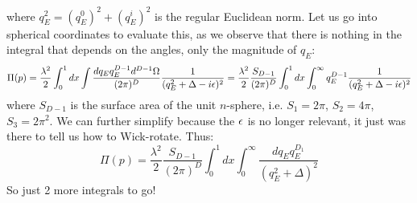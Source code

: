 where $q_E^2 = (q_E^0)^2 + (q_E^i)^2$ is the regular Euclidean norm. Let us go into spherical coordinates to evaluate this, as we observe that there is nothing in the integral that depends on the angles, only the magnitude of $q_E$:
\begin{equation}
    \Pi(p) = \frac{\lambda^2}{2} \int_0^1 dx \int \frac{dq_E q_E^{D-1}d^{D-1}\Omega}{(2\pi)^D}\frac{1}{(q_E^2 + \Delta - i\epsilon)^2} = \frac{\lambda^2}{2} \frac{S_{D-1}}{(2\pi)^D}\int_0^1 dx \int_0^\infty q_E^{D-1}\frac{1}{(q_E^2 + \Delta - i\epsilon)^2}
\end{equation}
where $S_{D-1}$ is the surface area of the unit $n$-sphere, i.e. $S_1 = 2\pi$, $S_2 = 4\pi$, $S_3 = 2\pi^2$. We can further simplify because the $\epsilon$ is no longer relevant, it just was there to tell us how to Wick-rotate. Thus:
\begin{equation}
    \Pi(p) = \frac{\lambda^2}{2}\frac{S_{D-1}}{(2\pi)^D}\int_0^1 dx \int_0^\infty \frac{dq_E q_E^{D_1}}{(q_E^2 + \Delta)^2}
\end{equation}
So just 2 more integrals to go!

